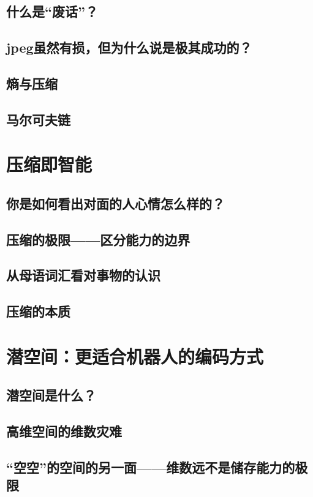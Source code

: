 \documentclass[UTF8, 12pt]{article}
\begin{document}
\subsection{什么是“废话”？}
\subsection{jpeg虽然有损，但为什么说是极其成功的？}
\subsection{熵与压缩}
\subsection{马尔可夫链}

\section{压缩即智能}
\subsection{你是如何看出对面的人心情怎么样的？}
\subsection{压缩的极限——区分能力的边界}
\subsection{从母语词汇看对事物的认识}
\subsection{压缩的本质}

\section{潜空间：更适合机器人的编码方式}
\subsection{潜空间是什么？}
\subsection{高维空间的维数灾难}
\subsection{“空空”的空间的另一面——维数远不是储存能力的极限}
\end{document}
